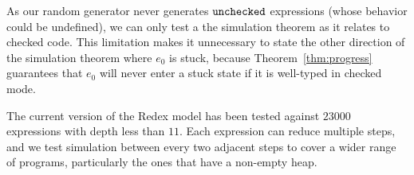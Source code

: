 

As our random generator never generates
$\mathtt{unchecked}$ expressions (whose behavior could be undefined), we can only test a the simulation theorem 
as it relates to checked code. This limitation makes it
unnecessary to state the other direction of the simulation theorem
where $e_0$ is stuck, because Theorem~\ref{thm:progress} guarantees
that $e_0$ will never enter a stuck state if it is well-typed in
checked mode.

The current version of the Redex model has been tested against $23000$
expressions with depth less than $11$. Each expression can
reduce multiple steps, and we test simulation between every two
adjacent steps to cover a wider range of programs, particularly the
ones that have a non-empty heap.

